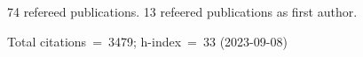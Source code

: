 74 refereed publications. 13 refeered publications as first author.

Total citations~=~3479; h-index~=~33 (2023-09-08)